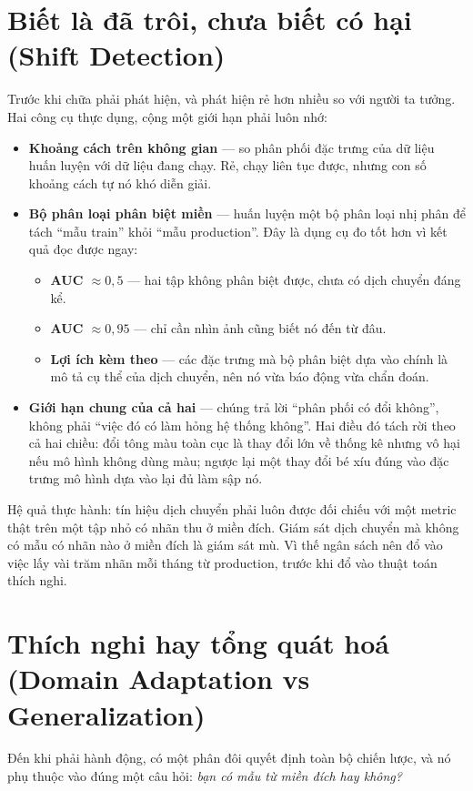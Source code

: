 \documentclass[../../deep_learning.tex]{subfiles}
\begin{document}
\section{Biết là đã trôi, chưa biết có hại (Shift Detection)}
Trước khi chữa phải phát hiện, và phát hiện rẻ hơn nhiều so với người ta tưởng. Hai công cụ thực dụng, cộng một giới hạn phải luôn nhớ:
\begin{itemize}
\item \textbf{Khoảng cách trên không gian } --- so phân phối đặc trưng của dữ liệu huấn luyện với dữ liệu đang chạy. Rẻ, chạy liên tục được, nhưng con số khoảng cách tự nó khó diễn giải.
\item \textbf{Bộ phân loại phân biệt miền} --- huấn luyện một bộ phân loại nhị phân để tách ``mẫu train'' khỏi ``mẫu production''. Đây là dụng cụ đo tốt hơn vì kết quả đọc được ngay:
  \begin{itemize}
  \item \textbf{AUC \(\approx 0{,}5\)} --- hai tập không phân biệt được, chưa có dịch chuyển đáng kể.
  \item \textbf{AUC \(\approx 0{,}95\)} --- chỉ cần nhìn ảnh cũng biết nó đến từ đâu.
  \item \textbf{Lợi ích kèm theo} --- các đặc trưng mà bộ phân biệt dựa vào chính là mô tả cụ thể của dịch chuyển, nên nó vừa báo động vừa chẩn đoán.
  \end{itemize}
\item \textbf{Giới hạn chung của cả hai} --- chúng trả lời ``phân phối có đổi không'', không phải ``việc đó có làm hỏng hệ thống không''. Hai điều đó tách rời theo cả hai chiều: đổi tông màu toàn cục là thay đổi lớn về thống kê nhưng vô hại nếu mô hình không dùng màu; ngược lại một thay đổi bé xíu đúng vào đặc trưng mô hình dựa vào lại đủ làm sập nó.
\end{itemize}
Hệ quả thực hành: tín hiệu dịch chuyển phải luôn được đối chiếu với một metric thật trên một tập nhỏ có nhãn thu ở miền đích. Giám sát dịch chuyển mà không có mẫu có nhãn nào ở miền đích là giám sát mù. Vì thế ngân sách nên đổ vào việc lấy vài trăm nhãn mỗi tháng từ production, trước khi đổ vào thuật toán thích nghi.

\section{Thích nghi hay tổng quát hoá (Domain Adaptation vs Generalization)}
Đến khi phải hành động, có một phân đôi quyết định toàn bộ chiến lược, và nó phụ thuộc vào đúng một câu hỏi: \emph{bạn có mẫu từ miền đích hay không?}
\end{document}

